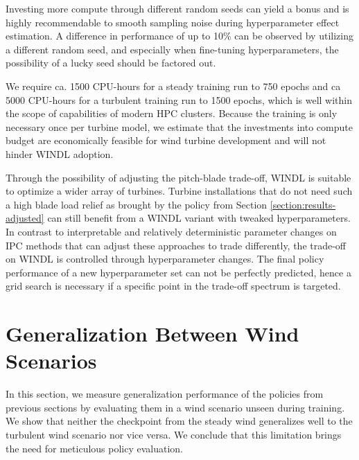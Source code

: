 Investing more compute through different random seeds can yield a bonus and is highly recommendable to smooth sampling noise during hyperparameter effect estimation. A difference in performance of up to 10\% can be observed by utilizing a different random seed, and especially when fine-tuning hyperparameters, the possibility of a lucky seed should be factored out. 

We require ca. 1500 CPU-hours for a steady training run to 750 epochs and ca 5000 CPU-hours for a turbulent training run to 1500 epochs, which is well within the scope of capabilities of modern HPC clusters. Because the training is only necessary once per turbine model, we estimate that the investments into compute budget are economically feasible for wind turbine development and will not hinder \ac{WINDL} adoption.

Through the possibility of adjusting the pitch-blade trade-off, WINDL is suitable to optimize a wider array of turbines. Turbine installations that do not need such a high blade load relief as brought by the policy from Section \ref{section:results-adjusted} can still benefit from a WINDL variant with tweaked hyperparameters. In contrast to interpretable and relatively deterministic parameter changes on IPC methods that can adjust these approaches to trade differently, the trade-off on WINDL is controlled through hyperparameter changes. The final policy performance of a new hyperparameter set can not be perfectly predicted, hence a grid search is necessary if a specific point in the trade-off spectrum is targeted.

\section{Generalization Between Wind Scenarios}
\label{section:results-transfer}

\begin{summary}
In this section, we measure generalization performance of the policies from previous sections by evaluating them in a wind scenario unseen during training. We show that neither the checkpoint from the steady wind generalizes well to the turbulent wind scenario nor vice versa. We conclude that this limitation brings the need for meticulous policy evaluation.
\end{summary}

